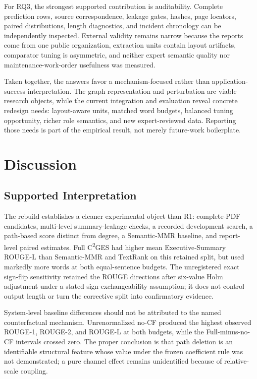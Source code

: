 \documentclass[applsci,article,submit,moreauthors]{Definitions/mdpi}
\newcommand{\cges}{C\textsuperscript{2}GES}
\begin{document}
For RQ3, the strongest supported contribution is auditability. Complete prediction rows, source correspondence, leakage gates, hashes, page locators, paired distributions, length diagnostics, and incident chronology can be independently inspected. External validity remains narrow because the reports come from one public organization, extraction units contain layout artifacts, comparator tuning is asymmetric, and neither expert semantic quality nor maintenance-work-order usefulness was measured.

Taken together, the answers favor a mechanism-focused rather than application-success interpretation. The graph representation and perturbation are viable research objects, while the current integration and evaluation reveal concrete redesign needs: layout-aware units, matched word budgets, balanced tuning opportunity, richer role semantics, and new expert-reviewed data. Reporting those needs is part of the empirical result, not merely future-work boilerplate.

\section{Discussion}

\subsection{Supported Interpretation}

The rebuild establishes a cleaner experimental object than R1: complete-PDF candidates, multi-level summary-leakage checks, a recorded development search, a path-based score distinct from degree, a Semantic-MMR baseline, and report-level paired estimates. Full \cges{} had higher mean Executive-Summary ROUGE-L than Semantic-MMR and TextRank on this retained split, but used markedly more words at both equal-sentence budgets. The unregistered exact sign-flip sensitivity retained the ROUGE directions after six-value Holm adjustment under a stated sign-exchangeability assumption; it does not control output length or turn the corrective split into confirmatory evidence.

System-level baseline differences should not be attributed to the named counterfactual mechanism. Unrenormalized no-CF produced the highest observed ROUGE-1, ROUGE-2, and ROUGE-L at both budgets, while the Full-minus-no-CF intervals crossed zero. The proper conclusion is that path deletion is an identifiable structural feature whose value under the frozen coefficient rule was not demonstrated; a pure channel effect remains unidentified because of relative-scale coupling.
\end{document}
